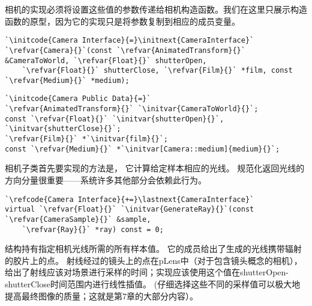 相机的实现必须将设置这些值的参数传递给相机构造函数。我们在这里只展示构造函数的原型，因为它的实现只是将参数复制到相应的成员变量。
\begin{lstlisting}
`\initcode{Camera Interface}{=}\initnext{CameraInterface}`
`\refvar{Camera}{}`(const `\refvar{AnimatedTransform}{}` &CameraToWorld, `\refvar{Float}{}` shutterOpen,
    `\refvar{Float}{}` shutterClose, `\refvar{Film}{}` *film, const `\refvar{Medium}{}` *medium);
\end{lstlisting}
\begin{lstlisting}
`\initcode{Camera Public Data}{=}`
`\refvar{AnimatedTransform}{}` `\initvar{CameraToWorld}{}`;
const `\refvar{Float}{}` `\initvar{shutterOpen}{}`, `\initvar{shutterClose}{}`;
`\refvar{Film}{}` *`\initvar{film}{}`;
const `\refvar{Medium}{}` *`\initvar[Camera::medium]{medium}{}`;
\end{lstlisting}
相机子类首先要实现的方法是，
它计算给定样本相应的光线。
规范化返回光线的方向分量很重要——系统许多其他部分会依赖此行为。
\begin{lstlisting}
`\refcode{Camera Interface}{+=}\lastnext{CameraInterface}`
virtual `\refvar{Float}{}` `\initvar{GenerateRay}{}`(const `\refvar{CameraSample}{}` &sample,
    `\refvar{Ray}{}` *ray) const = 0;
\end{lstlisting}
结构持有指定相机光线所需的所有样本值。
它的成员给出了生成的光线携带辐射的胶片上的点。
射线经过的镜头上的点在pLens中（对于包含镜头概念的相机），给出了射线应该对场景进行采样的时间；实现应该使用这个值在shutterOpen-shutterClose时间范围内进行线性插值。
(仔细选择这些不同的采样值可以极大地提高最终图像的质量；这就是第7章的大部分内容）。

